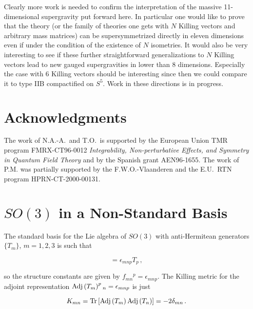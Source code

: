 \documentclass[12pt,a4paper]{article}
\begin{document}
Clearly more work is needed to confirm the interpretation of the
massive 11-dimensional supergravity put forward here. In particular
one would like to prove that the theory (or the family of theories one
gets with $N$ Killing vectors and arbitrary mass matrices) can be
supersymmetrized directly in eleven dimensions even if under the
condition of the existence of $N$ isometries.  It would also be very
interesting to see if these further straightforward generalizations to
$N$ Killing vectors lead to new gauged supergravities in lower than 8
dimensions.  Especially the case with 6 Killing vectors should be
interesting since then we could compare it to type IIB compactified on
$S^{5}$.  Work in these directions is in progress.

\section*{Acknowledgments}

The work of N.A.-A.~and T.O.~is supported by the European Union TMR
program FMRX-CT96-0012 {\sl Integrability, Non-perturbative Effects,
  and Symmetry in Quantum Field Theory} and by the Spanish grant
AEN96-1655.  The work of P.M. was partially supported by the
F.W.O.-Vlaanderen and the E.U.~RTN program HPRN-CT-2000-00131.

\appendix
\section{$SO(3)$ in a Non-Standard Basis}
\label{sec-so3}

The standard basis for the Lie algebra of $SO(3)$ with anti-Hermitean
generators $\{T_{m}\}$,  $m=1,2,3$ is such that

\begin{equation}
[T_{m},T_{n}] =\epsilon_{mnp}T_{p}\, ,  
\end{equation}

\noindent so the structure constants are given by $f_{mn}{}^{p}
=\epsilon_{mnp}$. The Killing metric for the adjoint representation
${\rm Adj}\left(T_{m}\right)^{p}{}_{n}=\epsilon_{mnp}$ is just

\begin{equation}
K_{mn}={\rm Tr}\left[{\rm Adj}\left(T_{m}\right)
{\rm Adj}\left(T_{n}\right)  \right] = -2\delta_{mn}\, .
\end{equation}
\end{document}
